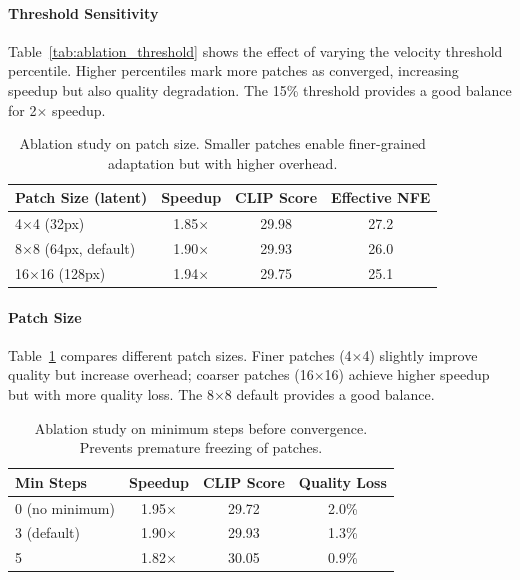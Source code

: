 \documentclass{article}
\begin{document}
\paragraph{Threshold Sensitivity} Table~\ref{tab:ablation_threshold} shows the effect of varying the velocity threshold percentile. Higher percentiles mark more patches as converged, increasing speedup but also quality degradation. The 15\% threshold provides a good balance for 2$\times$ speedup.

\begin{table}[t]
\caption{Ablation study on patch size. Smaller patches enable finer-grained adaptation but with higher overhead.}
\label{tab:ablation_patch}
\centering
\begin{tabular}{lccc}
\toprule
Patch Size (latent) & Speedup & CLIP Score & Effective NFE \\
\midrule
4$\times$4 (32px) & 1.85$\times$ & 29.98 & 27.2 \\
8$\times$8 (64px, default) & 1.90$\times$ & 29.93 & 26.0 \\
16$\times$16 (128px) & 1.94$\times$ & 29.75 & 25.1 \\
\bottomrule
\end{tabular}
\end{table}

\paragraph{Patch Size} Table~\ref{tab:ablation_patch} compares different patch sizes. Finer patches (4$\times$4) slightly improve quality but increase overhead; coarser patches (16$\times$16) achieve higher speedup but with more quality loss. The 8$\times$8 default provides a good balance.

\begin{table}[t]
\caption{Ablation study on minimum steps before convergence. Prevents premature freezing of patches.}
\label{tab:ablation_minsteps}
\centering
\begin{tabular}{lccc}
\toprule
Min Steps & Speedup & CLIP Score & Quality Loss \\
\midrule
0 (no minimum) & 1.95$\times$ & 29.72 & 2.0\% \\
3 (default) & 1.90$\times$ & 29.93 & 1.3\% \\
5 & 1.82$\times$ & 30.05 & 0.9\% \\
\bottomrule
\end{tabular}
\end{table}
\end{document}
